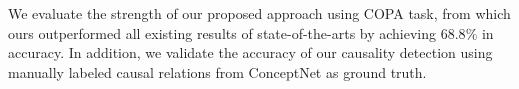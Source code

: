 We evaluate the strength of our proposed approach using COPA task,
from which ours outperformed all existing results of
state-of-the-arts by achieving $68.8\%$ in accuracy. In addition, we
validate the accuracy of our causality detection  using manually
labeled causal relations from ConceptNet as ground truth.
